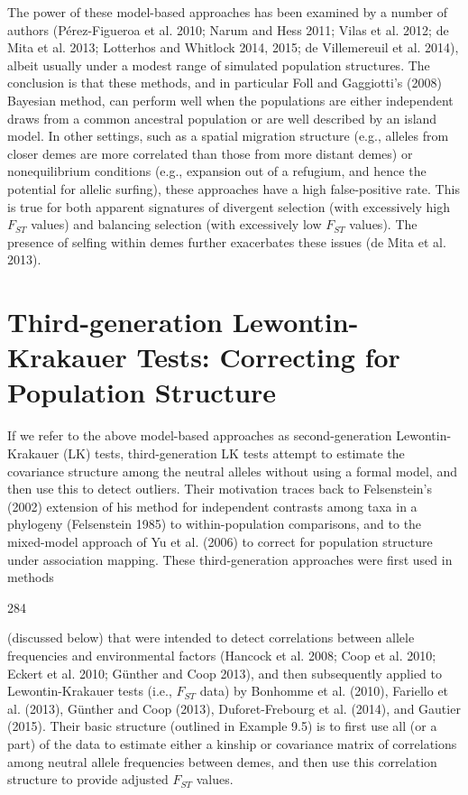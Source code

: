 \documentclass{article}
\begin{document}
The power of these model-based approaches has been examined by a number of authors (Pérez-Figueroa et al. 2010; Narum and Hess 2011; Vilas et al. 2012; de Mita et al. 2013; Lotterhos and Whitlock 2014, 2015; de Villemereuil et al. 2014), albeit usually under a modest range of simulated population structures. The conclusion is that these methods, and in particular Foll and Gaggiotti's (2008) Bayesian method, can perform well when the populations are either independent draws from a common ancestral population or are well described by an island model. In other settings, such as a spatial migration structure (e.g., alleles from closer demes are more correlated than those from more distant demes) or nonequilibrium conditions (e.g., expansion out of a refugium, and hence the potential for allelic surfing), these approaches have a high false-positive rate. This is true for both apparent signatures of divergent selection (with excessively high  $ F_{ST} $ values) and balancing selection (with excessively low  $ F_{ST} $ values). The presence of selfing within demes further exacerbates these issues (de Mita et al. 2013).

\section{Third-generation Lewontin-Krakauer Tests: Correcting for Population Structure}
If we refer to the above model-based approaches as second-generation Lewontin-Krakauer (LK) tests, third-generation LK tests attempt to estimate the covariance structure among the neutral alleles without using a formal model, and then use this to detect outliers. Their motivation traces back to Felsenstein's (2002) extension of his method for independent contrasts among taxa in a phylogeny (Felsenstein 1985) to within-population comparisons, and to the mixed-model approach of Yu et al. (2006) to correct for population structure under association mapping. These third-generation approaches were first used in methods

284

(discussed below) that were intended to detect correlations between allele frequencies and environmental factors (Hancock et al. 2008; Coop et al. 2010; Eckert et al. 2010; Günther and Coop 2013), and then subsequently applied to Lewontin-Krakauer tests (i.e.,  $ F_{ST} $ data) by Bonhomme et al. (2010), Fariello et al. (2013), Günther and Coop (2013), Duforet-Frebourg et al. (2014), and Gautier (2015). Their basic structure (outlined in Example 9.5) is to first use all (or a part) of the data to estimate either a kinship or covariance matrix of correlations among neutral allele frequencies between demes, and then use this correlation structure to provide adjusted  $ F_{ST} $ values.
\end{document}
